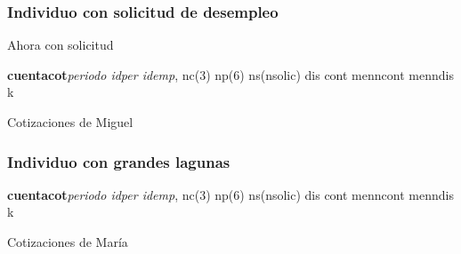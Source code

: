 \documentclass[8pt]{beamer}
\begin{document}
\begin{frame}[fragile]
\frametitle{Individuo con solicitud de desempleo}
Ahora con solicitud

\begin{semiverbatim}
{\bf cuentacot}{\it periodo idper idemp}, nc({\color{blue}3}) np({\color{blue}6}) ns({\color{blue}nsolic}) {\color{blue}dis cont menncont menndis k}
\end{semiverbatim}\pause\begin{table}
\caption{Cotizaciones de Miguel}
\scalebox{.6}{

}
\end{table}
\hyperlink{escenarios}{}
\end{frame}

\begin{frame}[fragile,label=caso7]
\frametitle{Individuo con grandes lagunas}

\begin{semiverbatim}
{\bf cuentacot}{\it periodo idper idemp}, nc({\color{blue}3}) np({\color{blue}6}) ns({\color{blue}nsolic}) {\color{blue}dis cont menncont menndis k}
\end{semiverbatim}
\pause
\begin{table}
\caption{Cotizaciones de María}
\scalebox{.6}{

}
\end{table}
\hyperlink{escenarios}{}
\end{frame}
\end{document}
